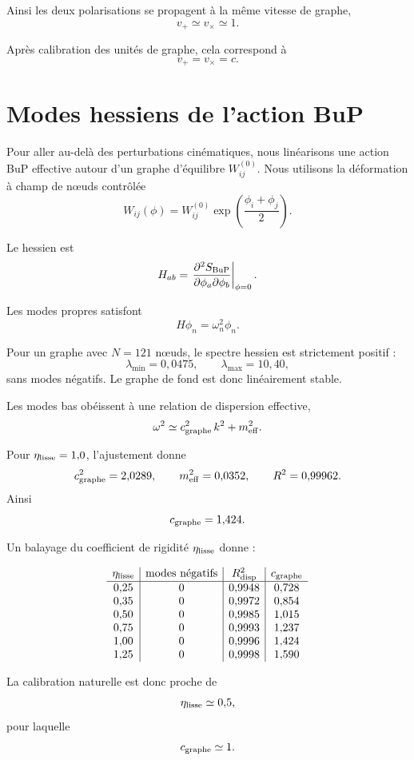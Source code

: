 \documentclass[11pt,a4paper]{article}
\begin{document}
Ainsi les deux polarisations se propagent à la même vitesse de graphe,
\[
v_+ \simeq v_\times \simeq 1.
\]

Après calibration des unités de graphe, cela correspond à
\[
v_+ = v_\times = c.
\]

\section{Modes hessiens de l'action BuP}

Pour aller au-delà des perturbations cinématiques, nous linéarisons une action
BuP effective autour d'un graphe d'équilibre \(W_{ij}^{(0)}\). Nous utilisons la
déformation à champ de nœuds contrôlée
\[
W_{ij}(\phi) = W_{ij}^{(0)} \exp\left(\frac{\phi_i + \phi_j}{2}\right).
\]

Le hessien est
\[
H_{ab} = \left. \frac{\partial^2 S_{\rm BuP}}{\partial \phi_a \partial \phi_b} \right|_{\phi = 0}.
\]

Les modes propres satisfont
\[
H \phi_n = \omega_n^2 \phi_n.
\]

Pour un graphe avec \(N = 121\) nœuds, le spectre hessien est strictement positif :
\[
\lambda_{\min} = 0{,}0475,
\qquad
\lambda_{\max} = 10{,}40,
\]
sans modes négatifs. Le graphe de fond est donc linéairement stable.

Les modes bas obéissent à une relation de dispersion effective,
\[
\omega^2 \simeq c_{\rm graphe}^2 \, k^2 + m_{\rm eff}^2.
\]

Pour \(\eta_{\rm lisse} = 1{,}0\), l'ajustement donne
\[
c_{\rm graphe}^2 = 2{,}0289,
\qquad
m_{\rm eff}^2 = 0{,}0352,
\qquad
R^2 = 0{,}99962.
\]
Ainsi
\[
c_{\rm graphe} = 1{,}424.
\]

Un balayage du coefficient de rigidité \(\eta_{\rm lisse}\) donne :

\[
\begin{array}{c|c|c|c}
\eta_{\rm lisse} & \text{modes négatifs} & R^2_{\rm disp} & c_{\rm graphe} \\
\hline
0{,}25 & 0 & 0{,}9948 & 0{,}728 \\
0{,}35 & 0 & 0{,}9972 & 0{,}854 \\
0{,}50 & 0 & 0{,}9985 & 1{,}015 \\
0{,}75 & 0 & 0{,}9993 & 1{,}237 \\
1{,}00 & 0 & 0{,}9996 & 1{,}424 \\
1{,}25 & 0 & 0{,}9998 & 1{,}590 \\
\end{array}
\]

La calibration naturelle est donc proche de
\[
\eta_{\rm lisse} \simeq 0{,}5,
\]
pour laquelle
\[
c_{\rm graphe} \simeq 1.
\]
\end{document}
